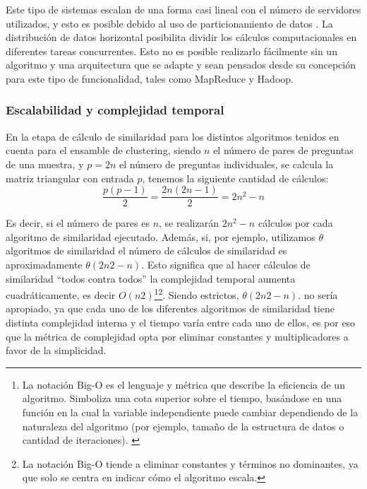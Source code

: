 \bigskip Este tipo de sistemas escalan de una forma casi lineal con el número de servidores utilizados, y esto es posible debido al uso de particionamiento de datos \citep{pokorny2013nosql}. La distribución de datos horizontal posibilita dividir los cálculos computacionales en diferentes tareas concurrentes. Esto no es posible realizarlo fácilmente sin un algoritmo y una arquitectura que se adapte y sean pensados desde su concepción para este tipo de funcionalidad, tales como MapReduce y Hadoop.

\subsubsection{Escalabilidad y complejidad temporal}
En la etapa de cálculo de similaridad para los distintos algoritmos tenidos en cuenta para el ensamble de clustering, siendo \(n\) el número de pares de preguntas de una muestra, y \(p = 2n\) el número de preguntas individuales, se calcula la matriz triangular con entrada \(p\), tenemos la siguiente cantidad de cálculos:
\[\frac{p(p-1)}{2} = \frac{2n(2n-1)}{2} = 2n^2-n\]

Es decir, si el número de pares es \(n\), se realizarán \(2n^2-n\) cálculos por cada algoritmo de similaridad ejecutado. Además, si, por ejemplo, utilizamos \(\theta\) algoritmos de similaridad el número de cálculos de similaridad es aproximadamente \(\theta(2n2-n)\). Esto significa que al hacer cálculos de similaridad “todos contra todos” la complejidad temporal aumenta cuadráticamente, es decir \(O(n2)\)\footnote{La notación Big-O es el lenguaje y métrica que describe la eficiencia de un algoritmo. Simboliza una cota superior sobre el tiempo, basándose en una función en la cual la variable independiente puede cambiar dependiendo de la naturaleza del algoritmo (por ejemplo, tamaño de la estructura de datos o cantidad de iteraciones). \citep{cormen2009introduction}}\footnote{La notación Big-O tiende a eliminar constantes y términos no dominantes, ya que solo se centra en indicar cómo el algoritmo escala. }. Siendo estrictos, \(\theta(2n2-n)\). no sería apropiado, ya que cada uno de los diferentes algoritmos de similaridad tiene distinta complejidad interna y el tiempo varía entre cada uno de ellos, es por eso que la métrica de complejidad opta por eliminar constantes y multiplicadores a favor de la simplicidad.

